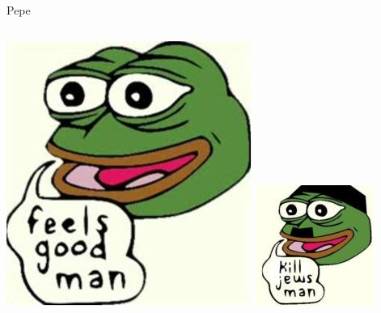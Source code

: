 \documentclass[nobackground,dvipsnames,table,aspectratio=169]{beamer}
\begin{document}
\begin{frame}{Pepe}
    \begin{columns}
            \includegraphics[width=\textwidth]{pepe}
            \includegraphics[width=\textwidth]{pepe-nazi}

\end{columns}
\end{frame}
\end{document}
